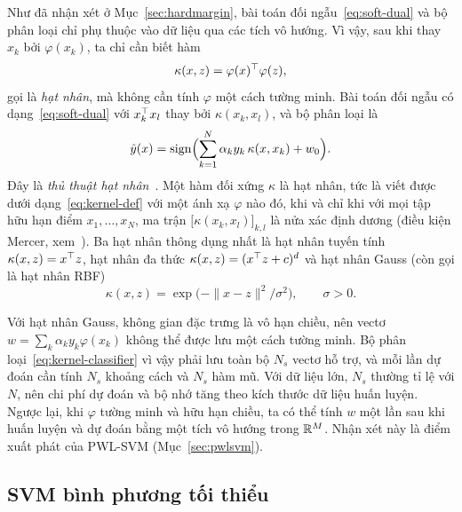 Như đã nhận xét ở Mục~\ref{sec:hardmargin}, bài toán đối ngẫu~\eqref{eq:soft-dual} và bộ phân loại chỉ phụ thuộc vào dữ liệu qua các tích vô hướng. Vì vậy, sau khi thay $x_k$ bởi $\varphi(x_k)$, ta chỉ cần biết hàm
\begin{equation}\label{eq:kernel-def}
\kappa(x,z)=\varphi(x)^\top\varphi(z),
\end{equation}
gọi là \emph{hạt nhân}, mà không cần tính $\varphi$ một cách tường minh. Bài toán đối ngẫu có dạng~\eqref{eq:soft-dual} với $x_k^\top x_l$ thay bởi $\kappa(x_k,x_l)$, và bộ phân loại là
\begin{equation}\label{eq:kernel-classifier}
\hat y(x)=\operatorname{sign}\Bigl(\sum_{k=1}^{N}\alpha_ky_k\,\kappa(x,x_k)+w_0\Bigr).
\end{equation}
Đây là \emph{thủ thuật hạt nhân}~\cite{boser1992,scholkopf2002}. Một hàm đối xứng $\kappa$ là hạt nhân, tức là viết được dưới dạng~\eqref{eq:kernel-def} với một ánh xạ $\varphi$ nào đó, khi và chỉ khi với mọi tập hữu hạn điểm $x_1,\dots,x_N$, ma trận $\bigl[\kappa(x_k,x_l)\bigr]_{k,l}$ là nửa xác định dương (điều kiện Mercer, xem~\cite[Chương~2]{scholkopf2002}). Ba hạt nhân thông dụng nhất là hạt nhân tuyến tính $\kappa(x,z)=x^\top z$, hạt nhân đa thức $\kappa(x,z)=(x^\top z+c)^d$ và hạt nhân Gauss (còn gọi là hạt nhân RBF)
\[
\kappa(x,z)=\exp\bigl(-\|x-z\|^2/\sigma^2\bigr),\qquad\sigma>0 .
\]

Với hạt nhân Gauss, không gian đặc trưng là vô hạn chiều, nên vectơ $w=\sum_k\alpha_ky_k\varphi(x_k)$ không thể được lưu một cách tường minh. Bộ phân loại~\eqref{eq:kernel-classifier} vì vậy phải lưu toàn bộ $N_s$ vectơ hỗ trợ, và mỗi lần dự đoán cần tính $N_s$ khoảng cách và $N_s$ hàm mũ. Với dữ liệu lớn, $N_s$ thường tỉ lệ với $N$, nên chi phí dự đoán và bộ nhớ tăng theo kích thước dữ liệu huấn luyện. Ngược lại, khi $\varphi$ tường minh và hữu hạn chiều, ta có thể tính $w$ một lần sau khi huấn luyện và dự đoán bằng một tích vô hướng trong $\mathbb{R}^M$. Nhận xét này là điểm xuất phát của PWL-SVM (Mục~\ref{sec:pwlsvm}).

\subsection{SVM bình phương tối thiểu}

